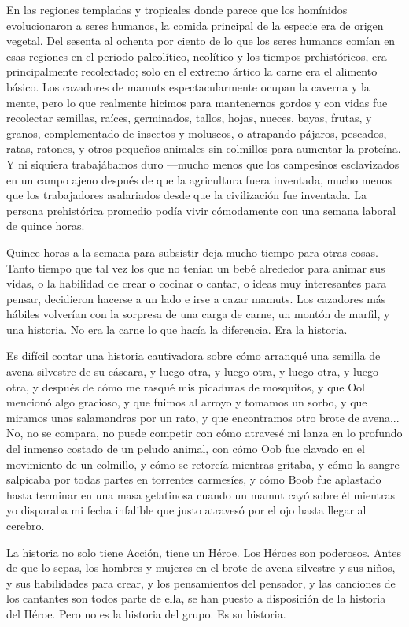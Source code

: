 
En las regiones templadas y tropicales donde
parece que los homínidos evolucionaron a seres
humanos, la comida principal de la especie era
de origen vegetal. Del sesenta al ochenta por
ciento de lo que los seres humanos comían en
esas regiones en el periodo paleolítico, neolítico
y los tiempos prehistóricos, era principalmente
recolectado; solo en el extremo ártico la carne
era el alimento básico. Los cazadores de mamuts
espectacularmente ocupan la caverna y la mente,
pero lo que realmente hicimos para mantenernos
gordos y con vidas fue recolectar semillas, raíces,
germinados, tallos, hojas, nueces, bayas, frutas, y
granos, complementado de insectos y moluscos,
o atrapando pájaros, pescados, ratas, ratones, y
otros pequeños animales sin colmillos para
aumentar la proteína. Y ni siquiera trabajábamos
duro ---mucho menos que los campesinos
esclavizados en un campo ajeno después de que
la agricultura fuera inventada, mucho menos que
los trabajadores asalariados desde que la
civilización fue inventada. La persona prehistórica
promedio podía vivir cómodamente con una semana 
laboral de quince horas.

Quince horas a la semana para subsistir deja
mucho tiempo para otras cosas. Tanto tiempo
que tal vez los que no tenían un bebé alrededor
para animar sus vidas, o la habilidad de crear o
cocinar o cantar, o ideas muy interesantes para
pensar, decidieron hacerse a un lado e irse a
cazar mamuts. Los cazadores más hábiles
volverían con la sorpresa de una carga de carne,
un montón de marfil, y una historia. No era la
carne lo que hacía la diferencia. Era la historia.

Es difícil contar una historia cautivadora sobre
cómo arranqué una semilla de avena silvestre de
su cáscara, y luego otra, y luego otra, y luego otra,
y luego otra, y después de cómo me rasqué mis
picaduras de mosquitos, y que Ool mencionó
algo gracioso, y que fuimos al arroyo y tomamos
un sorbo, y que miramos unas salamandras por
un rato, y que encontramos otro brote de avena...
No, no se compara, no puede competir con cómo
atravesé mi lanza en lo profundo del inmenso
costado de un peludo animal, con cómo Oob fue
clavado en el movimiento de un colmillo, y cómo
se retorcía mientras gritaba, y cómo la sangre
salpicaba por todas partes en torrentes
carmesíes, y cómo Boob fue aplastado hasta
terminar en una masa gelatinosa cuando un
mamut cayó sobre él mientras yo disparaba mi
fecha infalible que justo atravesó por el ojo hasta
llegar al cerebro.

La historia no solo tiene Acción, tiene un Héroe.
Los Héroes son poderosos. Antes de que lo
sepas, los hombres y mujeres en el brote de
avena silvestre y sus niños, y sus habilidades para
crear, y los pensamientos del pensador, y las
canciones de los cantantes son todos parte de
ella, se han puesto a disposición de la historia del
Héroe. Pero no es la historia del grupo. Es su
historia.

